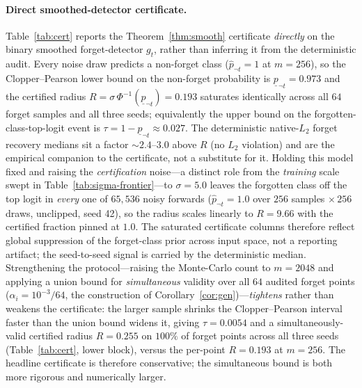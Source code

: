 \documentclass{article}
\begin{document}
\paragraph{Direct smoothed-detector certificate.} Table~\ref{tab:cert} reports the Theorem~\ref{thm:smooth} certificate \emph{directly} on the binary smoothed forget-detector $g_t$, rather than inferring it from the deterministic audit. Every noise draw predicts a non-forget class ($\hat p_{\neg t} = 1$ at $m = 256$), so the Clopper--Pearson lower bound on the non-forget probability is $\underline p_{\neg t} = 0.973$ and the certified radius $R = \sigma\,\Phi^{-1}(\underline p_{\neg t}) = 0.193$ saturates identically across all $64$ forget samples and all three seeds; equivalently the upper bound on the forgotten-class-top-logit event is $\tau = 1 - \underline p_{\neg t} \approx 0.027$. The deterministic native-$L_2$ forget recovery medians sit a factor $\sim\!2.4$--$3.0$ above $R$ (no $L_2$ violation) and are the empirical companion to the certificate, not a substitute for it. Holding this model fixed and raising the \emph{certification} noise---a distinct role from the \emph{training} scale swept in Table~\ref{tab:sigma-frontier}---to $\sigma = 5.0$ leaves the forgotten class off the top logit in \emph{every} one of $65{,}536$ noisy forwards ($\hat p_{\neg t} = 1.0$ over $256$ samples $\times\,256$ draws, unclipped, seed 42), so the radius scales linearly to $R = 9.66$ with the certified fraction pinned at $1.0$. The saturated certificate columns therefore reflect global suppression of the forget-class prior across input space, not a reporting artifact; the seed-to-seed signal is carried by the deterministic median. Strengthening the protocol---raising the Monte-Carlo count to $m=2048$ and applying a union bound for \emph{simultaneous} validity over all $64$ audited forget points ($\alpha_i = 10^{-3}/64$, the construction of Corollary~\ref{cor:gen})---\emph{tightens} rather than weakens the certificate: the larger sample shrinks the Clopper--Pearson interval faster than the union bound widens it, giving $\tau = 0.0054$ and a simultaneously-valid certified radius $R = 0.255$ on $100\%$ of forget points across all three seeds (Table~\ref{tab:cert}, lower block), versus the per-point $R = 0.193$ at $m=256$. The headline certificate is therefore conservative; the simultaneous bound is both more rigorous and numerically larger.
\end{document}
